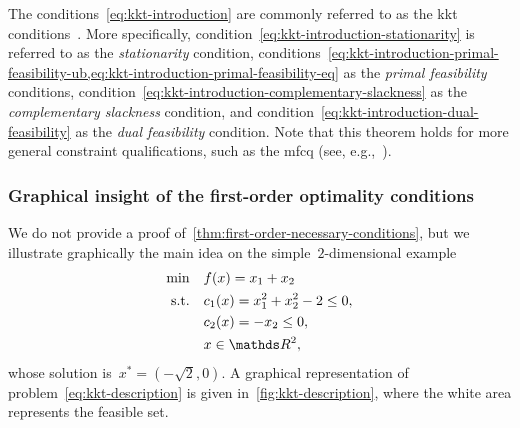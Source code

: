 The conditions~\cref{eq:kkt-introduction} are commonly referred to as the \gls{kkt} conditions~\cite{Karush_1939,Kuhn_Tucker_1951}.
More specifically, condition~\cref{eq:kkt-introduction-stationarity} is referred to as the \emph{stationarity} condition, conditions~\cref{eq:kkt-introduction-primal-feasibility-ub,eq:kkt-introduction-primal-feasibility-eq} as the \emph{primal feasibility} conditions, condition~\cref{eq:kkt-introduction-complementary-slackness} as the \emph{complementary slackness} condition, and condition~\cref{eq:kkt-introduction-dual-feasibility} as the \emph{dual feasibility} condition.
Note that this theorem holds for more general constraint qualifications, such as the \gls{mfcq} (see, e.g.,~\cite[p.~339]{Nocedal_Wright_2006}).

\subsubsection{Graphical insight of the first-order optimality conditions}

We do not provide a proof of~\cref{thm:first-order-necessary-conditions}, but we illustrate graphically the main idea on the simple~$2$-dimensional example
\begin{subequations}
    \label{eq:kkt-description}
    \begin{align}
        \min        & \quad \obj(x) = x_1 + x_2\\
        \text{s.t.} & \quad \con{1}(x) = x_1^2 + x_2^2 - 2 \le 0, \label{eq:kkt-description-c1}\\
                    & \quad \con{2}(x) = -x_2 \le 0, \label{eq:kkt-description-c2}\\
                    & \quad x \in \R^2, \nonumber
    \end{align}
\end{subequations}
whose solution is~$x^{\ast} = (-\sqrt{2}, 0)$.
A graphical representation of problem~\cref{eq:kkt-description} is given in~\cref{fig:kkt-description}, where the white area represents the feasible set.

